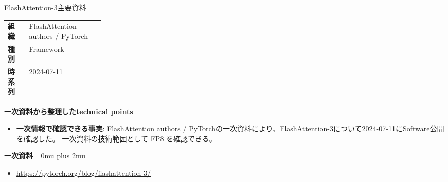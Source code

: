 \begin{technicalnote}{FlashAttention-3}{主要資料}
\begingroup
\begin{tabularx}{\linewidth}{@{}>{\bfseries}p{0.22\linewidth}X@{}}
組織 & FlashAttention authors / PyTorch \\
種別 & Framework \\
時系列 & 2024-07-11 \\
\end{tabularx}
\smallskip
{\bfseries 一次資料から整理したtechnical points}
\begin{itemize}[leftmargin=1.5em,itemsep=0.35em]
\item \textbf{一次情報で確認できる事実}: FlashAttention authors / PyTorchの一次資料により、FlashAttention-3について2024-07-11にSoftware公開を確認した。 一次資料の技術範囲として FP8 を確認できる。
\end{itemize}
\begin{minipage}{\linewidth}
\begin{samepage}
{\bfseries 一次資料}
\begingroup\sloppy
\Urlmuskip=0mu plus 2mu\relax
\begin{itemize}[leftmargin=1.5em,itemsep=0.25em]
\item {\scriptsize\url{https://pytorch.org/blog/flashattention-3/}}
\end{itemize}
\endgroup
\end{samepage}
\end{minipage}
\endgroup
\end{technicalnote}
\medskip


